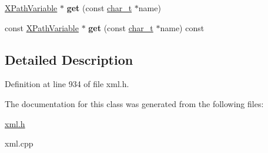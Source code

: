 \begin{DoxyCompactItemize}
\item 
\hypertarget{classphys_1_1xml_1_1XPathVariableSet_a6c7429a3e50c1980a7fcdcee8af66834}{
\hyperlink{classphys_1_1xml_1_1XPathVariable}{XPathVariable} $\ast$ {\bfseries get} (const \hyperlink{namespacephys_1_1xml_afc87705cd1c2917d87b879715a2d8f6e}{char\_\-t} $\ast$name)}
\label{df/dd1/classphys_1_1xml_1_1XPathVariableSet_a6c7429a3e50c1980a7fcdcee8af66834}

\item 
\hypertarget{classphys_1_1xml_1_1XPathVariableSet_a3990eb85bebe88a7d4892eac19d4aa1b}{
const \hyperlink{classphys_1_1xml_1_1XPathVariable}{XPathVariable} $\ast$ {\bfseries get} (const \hyperlink{namespacephys_1_1xml_afc87705cd1c2917d87b879715a2d8f6e}{char\_\-t} $\ast$name) const }
\label{df/dd1/classphys_1_1xml_1_1XPathVariableSet_a3990eb85bebe88a7d4892eac19d4aa1b}

\end{DoxyCompactItemize}


\subsection{Detailed Description}


Definition at line 934 of file xml.h.



The documentation for this class was generated from the following files:\begin{DoxyCompactItemize}
\item 
\hyperlink{xml_8h}{xml.h}\item 
xml.cpp\end{DoxyCompactItemize}
